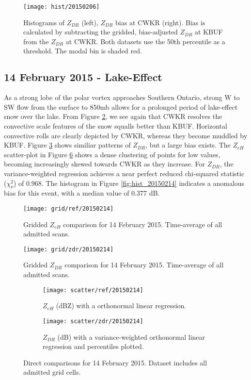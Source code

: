\begin{figure}[H]
\texttt{[image: hist/20150206]}\centering
\caption{Histograms of $Z_{DR}$ (left), $Z_{DR}$ bias at CWKR (right). Bias is calculated by subtracting the gridded, bias-adjusted $Z_{DR}$ at KBUF from the
$Z_{DR}$ at CWKR. Both datasets use the 50th percentile as a threshold. The modal bin is shaded red.} 
\label{fig:hist_20150206}
\end{figure}

\subsection{14 February 2015 - Lake-Effect}
As a strong lobe of the polar vortex approaches Southern Ontario, strong W to SW flow from the surface to 850mb allows for a prolonged period of lake-effect snow over the lake. From Figure \ref{fig:grid_ref_20150214}, we see again that CWKR resolves the convective scale features of the snow squalls better than KBUF. Horizontal convective rolls are clearly depicted by CWKR, whereas they become muddled by KBUF. Figure \ref{fig:grid_zdr_20150214} shows similiar patterns of $Z_{DR}$, but a large bias exists. The $Z_{eH}$ scatter-plot in Figure \ref{fig:scatter_20150214} shows a dense clustering of points for low values, becoming increasingly skewed towards CWKR as they increase. For $Z_{DR}$, the variance-weighted regression achieves a near perfect reduced chi-squared statistic ($\chi^2_\nu$) of 0.968. The histogram in Figure \ref{fig:hist_20150214} indicates a anomalous bias for this event, with a median value of 0.377 dB.

\begin{figure}[p]
\texttt{[image: grid/ref/20150214]}
\caption{Gridded $Z_{eH}$ comparison for 14 February 2015. Time-average of all admitted scans.} 
\label{fig:grid_ref_20150214}
\end{figure}

\begin{figure}[p]
\texttt{[image: grid/zdr/20150214]}
\caption{Gridded $Z_{DR}$ comparison for 14 February 2015. Time-average of all admitted scans.} 
\label{fig:grid_zdr_20150214}
\end{figure}

\begin{figure}[p]
\centering
   \begin{subfigure}[t]{0.48\linewidth} \centering
     \texttt{[image: scatter/ref/20150214]}
     \caption{$Z_{eH}$ (dBZ) with a orthonormal linear regression.}\label{fig:scatter_ref_20150214}
   \end{subfigure}
   \begin{subfigure}[t]{0.48\linewidth} \centering
     \texttt{[image: scatter/zdr/20150214]}
     \caption{$Z_{DR}$ (dB) with a variance-weighted orthonormal linear regression and percentiles plotted.}\label{fig:scatter_zdr_20150214}
   \end{subfigure}
\caption{Direct comparisons for 14 February 2015. Dataset includes all admitted grid cells.} \label{fig:scatter_20150214}
\end{figure}


